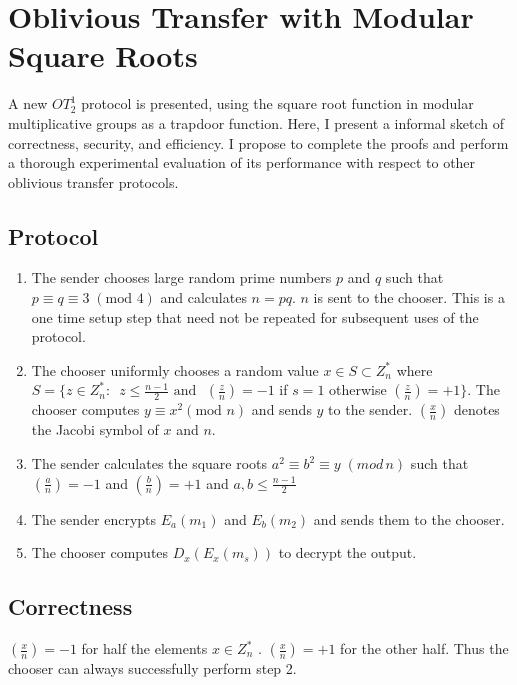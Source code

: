 
\chapter{Oblivious Transfer with Modular Square Roots}\label{sec:OT-SquareRoots}
\label{chapter:otquad}

A new $OT_{2}^{1}$ protocol is presented, using the square root function
in modular multiplicative groups as a trapdoor function. Here, I present
a informal sketch of correctness, security, and efficiency. I propose
to complete the proofs and perform a thorough experimental evaluation
of its performance with respect to other oblivious transfer protocols.


\section{Protocol}
\begin{enumerate}
\item The sender chooses large random prime numbers $p$ and $q$ such that
$p\equiv q\equiv3\;(\mbox{mod }4)$ and calculates $n=pq$. $n$ is
sent to the chooser. This is a one time setup step that need not be
repeated for subsequent uses of the protocol.
\item The chooser uniformly chooses a random value $x\in S\subset Z_{n}^{*}$
where $S=\{z\in Z_{n}^{*}:$~$z\le\frac{n-1}{2}\mbox{ and }$ $\left(\frac{z}{n}\right)=-1$
if $s=1$ otherwise $\left(\frac{z}{n}\right)=+1\}$. The chooser
computes $y\equiv x^{2}(\mbox{mod }n)$ and sends $y$ to the sender.
$\left(\frac{x}{n}\right)$ denotes the Jacobi symbol of $x$ and
$n$.
\item The sender calculates the square roots $a^{2}\equiv b^{2}\equiv y\;(mod\, n)$
such that $\left(\frac{a}{n}\right)=-1$ and $\left(\frac{b}{n}\right)=+1$
and $a,b\le\frac{n-1}{2}$
\item The sender encrypts $E_{a}(m_{1})$ and $E_{b}(m_{2})$ and sends
them to the chooser.
\item The chooser computes $D_{x}(E_{x}(m_{s}))$ to decrypt the output.
\end{enumerate}

\section{Correctness}

$\left(\frac{x}{n}\right)=-1$ for half the elements $x\in Z_{n}^{*}$
. $\left(\frac{x}{n}\right)=+1$ for the other half. Thus the chooser
can always successfully perform step 2.

